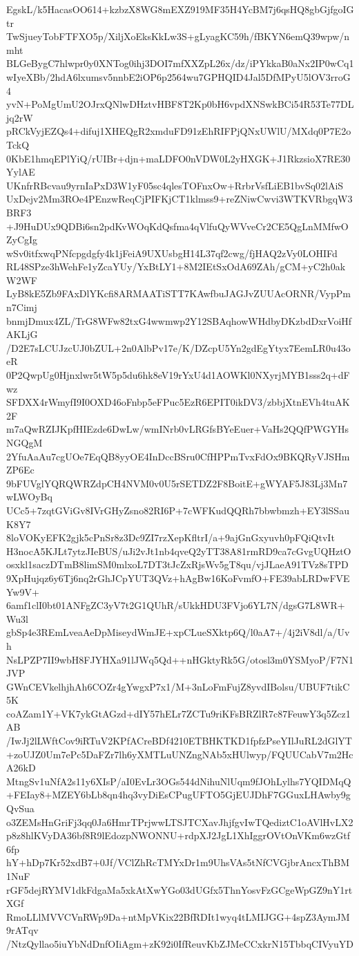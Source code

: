EgskL/k5HacasOO614+kzbzX8WG8mEXZ919MF35H4YcBM7j6qsHQ8gbGjfgoIGtr
TwSjueyTobFTFXO5p/XiljXoEksKkLw3S+gLyagKC59h/fBKYN6emQ39wpw/nmht
BLGeBygC7hlwpr0y0XNTog0ihj3DOI7mfXXZpL26x/dz/iPYkkaB0aNx2IP0wCq1
wIyeXBb/2hdA6lxumsv5nnbE2iOP6p2564wu7GPHQID4Jal5DfMPyU5lOV3rroG4
yvN+PoMgUmU2OJrxQNlwDHztvHBF8T2Kp0bH6vpdXNSwkBCi54R53Te77DLjq2rW
pRCkVyjEZQs4+difuj1XHEQgR2xmduFD91zEhRIFPjQNxUWlU/MXdq0P7E2oTckQ
0KbE1hmqEPlYiQ/rUIBr+djn+maLDFO0nVDW0L2yHXGK+J1RkzsioX7RE30YylAE
UKnfrRBcvau9yrnIaPxD3W1yF05sc4qlesTOFnxOw+RrbrVsfLiEB1bvSq02lAiS
UxDejv2Mm3ROe4PEnzwReqCjPIFKjCT1klmss9+reZNiwCwvi3WTKVRbgqW3BRF3
+J9HuDUx9QDBi6sn2pdKvWOqKdQsfma4qVlfuQyWVveCr2CE5QgLnMMfwOZyCgIg
wSv0itfxwqPNfcpgdgfy4k1jFeiA9UXUsbgH14L37qf2cwg/fjHAQ2zVy0LOHIFd
RL48SPze3hWehFe1yZcaYUy/YxBtLY1+8M2IEtSxOdA69ZAh/gCM+yC2h0akW2WF
LyB8kE5Zb9FAxDlYKcfi8ARMAATiSTT7KAwfbuJAGJvZUUAcORNR/VypPmn7Cimj
bnmjDmux4ZL/TrG8WFw82txG4wwmwp2Y12SBAqhowWHdbyDKzbdDxrVoiHfAKLjG
/D2E7sLCUJzcUJ0bZUL+2n0AlbPv17e/K/DZcpU5Yn2gdEgYtyx7EemLR0u43oeR
0P2QwpUg0Hjnxlwr5tW5p5du6hk8eV19rYxU4d1AOWKl0NXyrjMYB1sss2q+dFwz
SFDXX4rWmyfI9I0OXD46oFnbp5eFPuc5EzR6EPIT0ikDV3/zbbjXtnEVh4tuAK2F
m7aQwRZIJKpfHIEzde6DwLw/wmINrb0vLRGfsBYeEuer+VaHs2QQfPWGYHsNGQgM
2YfuAaAu7cgUOe7EqQB8yyOE4InDccBSru0CfHPPmTvxFdOx9BKQRyVJSHmZP6Ec
9bFUVglYQRQWRZdpCH4NVM0v0U5rSETDZ2F8BoitE+gWYAF5J83Lj3Mn7wLWOyBq
UCc5+7zqtGViGv8IVrGHyZsno82RI6P+7cWFKudQQRh7bbwbmzh+EY3lSSauK8Y7
8loVOKyEFK2gjk5cPnSr8z3Dc9ZI7rzXepKfltrI/a+9ajGnGxyuvh0pFQiQtvIt
H3nocA5KJLt7ytzJIeBUS/uJi2vJt1nb4qveQ2yTT38A81rmRD9ca7cGvgUQHztO
osxkl1saczDTmB8limSM0mlxoL7DT3tJcZxRjsWv5gT8qu/vjJLaeA91TVz8sTPD
9XpHujqz6y6Tj6nq2rGhJCpYUT3QVz+hAgBw16KoFvmfO+FE39abLRDwFVEYw9V+
6amf1clI0bt01ANFgZC3yV7t2G1QUhR/sUkkHDU3FVjo6YL7N/dgsG7L8WR+Wu3l
gbSp4e3REmLveaAeDpMiseydWmJE+xpCLueSXktp6Q/l0aA7+/4j2iV8dl/a/Uvh
NsLPZP7II9wbH8FJYHXa91lJWq5Qd++nHGktyRk5G/otosl3m0YSMyoP/F7N1JVP
GWnCEVkelhjhAh6COZr4gYwgxP7x1/M+3nLoFmFujZ8yvdIBolsu/UBUF7tikC5K
coAZam1Y+VK7ykGtAGzd+dIY57hELr7ZCTu9riKFsBRZlR7c87FeuwY3q5Zcz1AB
/IwJj2lLWftCov9iRTuV2KPfACreBDf4210ETBHKTKD1fpfzPseYIlJuRL2dGlYT
+zoUJZ0Um7ePc5DaFZr7lh6yXMTLuUNZngNAb5xHUlwyp/FQUUCabV7m2HcA26kD
MtngSv1uNfA2s11y6XIsP/aI0EvLr3OGs544dNihuNlUqm9fJOhLylhs7YQIDMqQ
+FEIay8+MZEY6bLb8qn4hq3vyDiEsCPugUFTO5GjEUJDhF7GGuxLHAwby9gQvSua
o3ZEMsHnGriFj3qq0Ja6HmrTPrjwwLTSJTCXavJhjfgvIwTQediztC1oAVlHvLX2
p8z8hlKVyDA36bf8R9lEdozpNWONNU+rdpXJ2JgL1XhIggrOVtOnVKm6wzGtf6fp
hY+hDp7Kr52xdB7+0Jf/VClZhRcTMYxDr1m9UhsVAs5tNfCVGjbrAncxThBM1NuF
rGF5dejRYMV1dkFdgaMa5xkAtXwYGo03dUGfx5ThnYosvFzGCgeWpGZ9nY1rtXGf
RmoLLlMVVCVnRWp9Da+ntMpVKix22BfRDIt1wyq4tLMIJGG+4spZ3AymJM9rATqv
/NtzQyllao5iuYbNdDnfOIiAgm+zK92i0IfReuvKbZJMeCCxkrN15TbbqCIVyuYD

